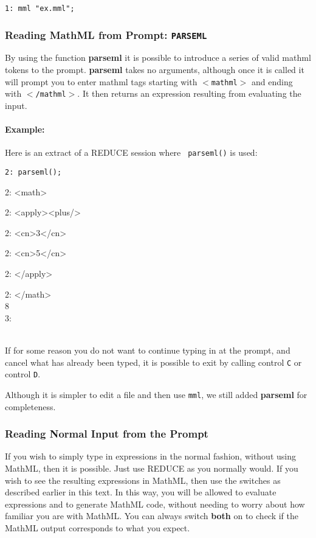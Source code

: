 \documentclass{article}
\begin{document}
{\tt 1:  mml "ex.mml";}


\subsubsection{Reading MathML from Prompt: {\tt PARSEML}}

By using the function {\bf parseml} it is possible to introduce a series of
valid mathml tokens to the prompt. {\bf parseml} takes no arguments,
although once it is called it will prompt you to enter mathml tags starting
with {\tt $<$mathml$>$} and ending with {\tt $<$/mathml$>$}. It then returns
an
expression resulting from evaluating the input. \\

\paragraph{Example:} Here is an extract of a REDUCE session where {\tt
parseml()} is used:

{\tt 2: parseml(); 

2: <math> 

2: <apply><plus/> 

2: <cn>3</cn> 

2: <cn>5</cn> 

2: </apply> 

2: </math> 
\\

\hspace*{1cm}  8 \\

3: } \\

If for some reason you do not want to continue typing in at the prompt, and
cancel what has already been typed, it is possible to exit by calling 
control {\tt C} or control {\tt D}.

Although it is simpler to edit a file and then use {\tt mml}, we still
added {\bf parseml} for completeness.     

\subsubsection{Reading Normal Input from the Prompt}

If you wish to simply type in expressions in the normal fashion, without
using MathML, then it is possible. Just use REDUCE as you normally would. If
you wish to see the resulting expressions in MathML, then use the switches as
described earlier in this text. In this way, you will be allowed to evaluate
expressions and to generate MathML code, without needing to worry about how
familiar you are with MathML. You can always switch {\bf both} on to check if
the MathML output corresponds to what you expect. 
\end{document}
